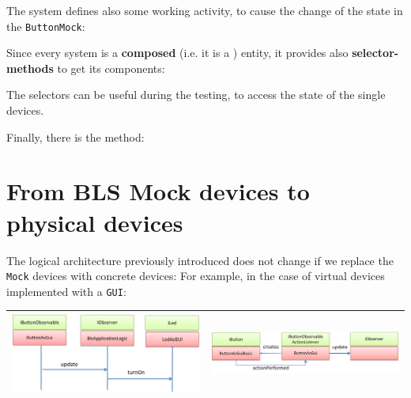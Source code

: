 \documentclass[10pt,a4paper,openright,twoside]{../llncs}
\newcommand{\code}[1]{{\color{blue}{\texttt{#1}}}}
\begin{document}
 
 
 
The system defines also some working activity, to cause the change of the state in the \texttt{ButtonMock}:

 

Since every system is a \textbf{composed} (i.e. it is a \code{non-atomic}) entity, it provides also \textbf{selector-methods} to get its components:

 

The selectors can be useful during the testing, to access the state of the single devices.

Finally, there is the \code{main} method:
 

\newpage 
\section{From BLS Mock devices to physical devices}
The logical architecture previously introduced does not change if we replace the \texttt{Mock} devices with concrete devices: For example, in the case of virtual devices implemented with a \texttt{GUI}:


\medskip 
\begin{tabular}{|c|c|}
\hline 
\includegraphics[scale = 0.3]{img/blsGuiUM.png} &  \includegraphics[scale = 0.3]{img/buttonGuiUM.png}\\
\hline 
\end{tabular}
\medskip 
\end{document}
